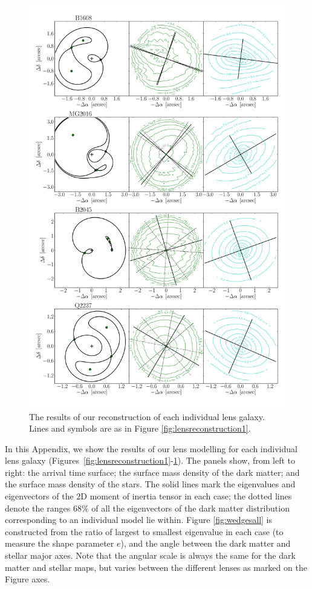 \documentclass[useAMS,usenatbib]{mn2e}
\begin{document}
\begin{figure}
  \centering
  \includegraphics[width=.8\linewidth]{Figures/AllLenses33.pdf}
  \caption[width=.65\linewidth]{The results of our reconstruction of each individual lens galaxy. Lines and symbols are as in Figure \ref{fig:lensreconstruction1}.}
  \label{fig:lensreconstruction3}
\end{figure}

In this Appendix, we show the results of our lens modelling for each individual lens galaxy (Figures~\ref{fig:lensreconstruction1}-\ref{fig:lensreconstruction3}). The panels show, from left to right: the arrival time surface; the surface mass density of the dark matter; and the surface mass density of the stars. The solid lines mark the eigenvalues and eigenvectors of the 2D moment of inertia tensor in each case; the dotted lines denote the ranges 68\% of all the eigenvectors of the dark matter distribution corresponding to an individual model lie within. Figure \ref{fig:wedgesall} is constructed from the ratio of largest to smallest eigenvalue in each case (to measure the shape parameter $e$), and the angle between the dark matter and stellar major axes. Note that the angular scale is always the same for the dark matter and stellar maps, but varies between the different lenses as marked on the Figure axes.
\end{document}
